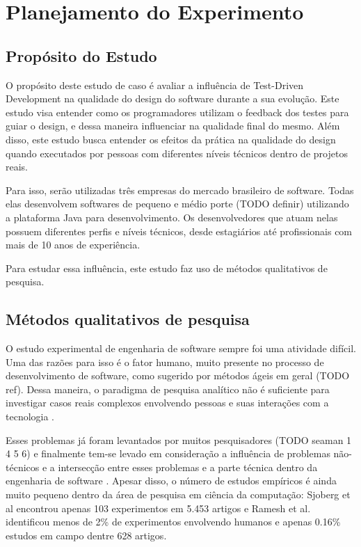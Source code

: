 \chapter{Planejamento do Experimento}
\label{cap:planejamento}

\section{Propósito do Estudo} 
\label{sec:planejamento-proposito}

O propósito deste estudo de caso é avaliar a influência de Test-Driven Development na qualidade do 
design do software durante a sua evolução. Este estudo visa entender como os programadores utilizam o 
feedback dos testes para guiar o design, e dessa maneira influenciar na qualidade final do mesmo. 
Além disso, este estudo busca entender os efeitos da prática na qualidade do design quando executados 
por pessoas com diferentes níveis técnicos dentro de projetos reais.

Para isso, serão utilizadas três empresas do mercado brasileiro de software. Todas elas desenvolvem
softwares de pequeno e médio porte (TODO definir) utilizando a plataforma Java para desenvolvimento.
Os desenvolvedores que atuam nelas possuem diferentes perfis e níveis técnicos, desde estagiários até
profissionais com mais de 10 anos de experiência.

Para estudar essa influência, este estudo faz uso de métodos qualitativos de pesquisa.

\section{Métodos qualitativos de pesquisa} 
\label{sec:planejamento-qualitativa}

O estudo experimental de engenharia de software sempre foi uma atividade difícil. Uma das razões para isso é o
fator humano, muito presente no processo de desenvolvimento de software, como sugerido por métodos ágeis em geral (TODO ref). 
Dessa maneira, o paradigma de pesquisa analítico não é suficiente para investigar casos reais complexos envolvendo pessoas
e suas interações com a tecnologia \cite{guidelines-case-study}.

Esses problemas já foram levantados por muitos pesquisadores (TODO seaman 1 4 5 6) e finalmente tem-se 
levado em consideração a influência de problemas não-técnicos e a intersecção entre esses problemas e a parte técnica 
dentro da engenharia de software \cite{seaman}.
Apesar disso, o número de estudos empíricos é ainda muito pequeno dentro da área de pesquisa em ciência da computação: 
Sjoberg et al \cite{sjoberg} encontrou apenas 103 experimentos em 5.453 artigos e Ramesh et al. \cite{ramesh} 
identificou menos de 2\% de experimentos envolvendo humanos e apenas 0.16\% estudos em campo dentre 628 artigos.

